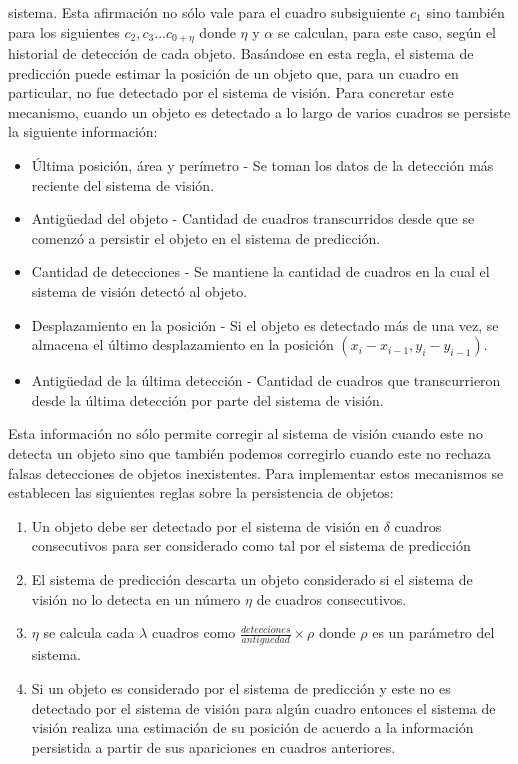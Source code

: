 sistema. Esta afirmaci\'on no s\'olo vale para el cuadro subsiguiente 
$c_1$ sino tambi\'en para los siguientes $c_2,c_3 ... c_{0+\eta}$ donde 
$\eta$ y $\alpha$ se calculan, para este caso, seg\'un el 
historial de detecci\'on de cada objeto.  Bas\'andose en esta regla, el 
sistema de predicci\'on puede estimar la posici\'on de un objeto que, 
para un cuadro en particular, no fue detectado por el sistema de 
visi\'on. Para concretar este mecanismo, cuando un objeto es detectado a lo largo de varios cuadros se persiste la siguiente informaci\'on:
\begin{itemize}
\item{ \'Ultima posici\'on, \'area y per\'imetro - Se toman los datos de la 
detecci\'on m\'as reciente del sistema de visi\'on.}
\item{ Antig\"uedad del objeto - Cantidad de cuadros transcurridos desde que se comenz\'o a persistir el objeto en el sistema de predicci\'on.}
\item{ Cantidad de detecciones - Se mantiene la cantidad de cuadros en la cual el sistema de visi\'on detect\'o al objeto.}
\item{ Desplazamiento en la posici\'on - Si el objeto es detectado m\'as 
de una vez, se almacena el \'ultimo desplazamiento en la posici\'on $(x_i - 
x_{i-1}, y_i - y_{i-1} )$.}
\item{ Antig\"uedad de la \'ultima detecci\'on - Cantidad de cuadros que transcurrieron desde la \'ultima detecci\'on por parte del sistema de visi\'on.}  
\end{itemize}
Esta informaci\'on no s\'olo permite corregir al sistema de visi\'on 
cuando este no detecta un objeto sino que tambi\'en podemos corregirlo 
cuando este no rechaza falsas detecciones de objetos inexistentes. Para 
implementar estos mecanismos se establecen las siguientes reglas sobre 
la persistencia de objetos:
\begin{enumerate}
\item{Un objeto debe ser detectado por el sistema de visi\'on en $\delta$ 
cuadros consecutivos para ser considerado como tal por el sistema de 
predicci\'on}
\item{El sistema de predicci\'on descarta un objeto considerado si el 
sistema de visi\'on no lo detecta en un n\'umero $\eta$ de cuadros 
consecutivos.}
\item{ $\eta$ se calcula cada $\lambda$ cuadros como 
$\frac{detecciones}{antiguedad}\times \rho$ donde $\rho$ es un par\'ametro del 
sistema}.
\item{ Si un objeto es considerado por el sistema de predicci\'on y este 
no es detectado por el sistema de visi\'on para alg\'un cuadro entonces 
el sistema de visi\'on realiza una estimaci\'on de su posici\'on de 
acuerdo a la informaci\'on persistida a partir de sus apariciones en cuadros anteriores.}
\end{enumerate}

